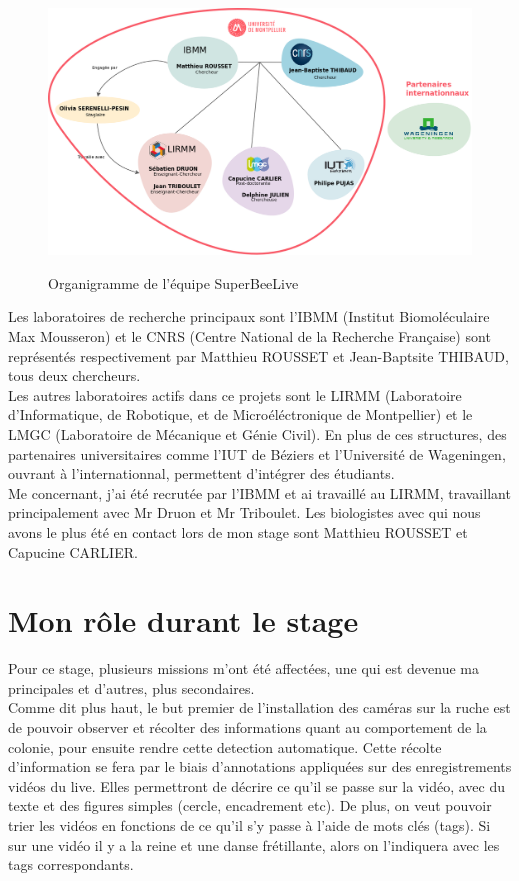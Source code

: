 \documentclass[11pt,french,a4paper]{report}
\begin{document}
\begin{figure}[!h]
\centering
\includegraphics[scale=0.3]{../images/dia/organiramme_equipe_projet.png} \\
\caption{Organigramme de l'équipe SuperBeeLive}
\label{organigramme_equipe_superbeelive}
\end{figure}

Les laboratoires de recherche principaux sont l'IBMM (Institut Biomoléculaire Max Mousseron) 
et le CNRS (Centre National de la Recherche Française) sont représentés respectivement par Matthieu ROUSSET et Jean-Baptsite THIBAUD, 
tous deux chercheurs. \\
Les autres laboratoires actifs dans ce projets sont le LIRMM (Laboratoire d'Informatique, de Robotique, 
et de Microéléctronique de Montpellier) et le LMGC (Laboratoire de Mécanique et Génie Civil). En plus de ces structures, 
des partenaires universitaires comme l'IUT de Béziers et l'Université de Wageningen, ouvrant à l'internationnal,
permettent d'intégrer des étudiants. \\
Me concernant, j'ai été recrutée par l'IBMM et ai travaillé au LIRMM, travaillant principalement avec Mr Druon et 
Mr Triboulet. Les biologistes avec qui nous avons le plus été en contact lors de mon stage sont Matthieu ROUSSET et Capucine CARLIER. \\


\section{Mon rôle durant le stage}
Pour ce stage, plusieurs missions m'ont été affectées, une qui est devenue ma principales et d'autres, plus secondaires.\\

Comme dit plus haut, le but premier de l'installation des caméras sur la ruche est de pouvoir observer et récolter des informations
quant au comportement de la colonie, pour ensuite rendre cette detection automatique. Cette récolte d'information se fera par le 
biais d'annotations appliquées sur des enregistrements vidéos du live. Elles permettront de décrire ce qu'il se passe sur la vidéo, 
avec du texte et des figures simples (cercle, encadrement etc).
De plus, on veut pouvoir trier les vidéos en fonctions de ce qu'il s'y passe à l'aide de mots clés (tags). 
Si sur une vidéo il y a la reine et une danse frétillante, alors on l'indiquera avec les tags correspondants. \\
\end{document}

